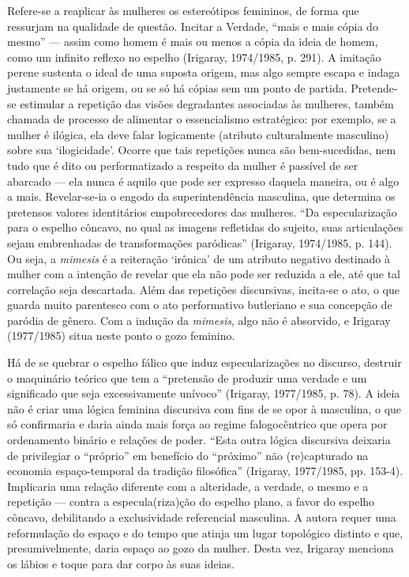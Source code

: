 Refere-se a reaplicar às mulheres os estereótipos femininos, de forma
que ressurjam na qualidade de questão. Incitar a Verdade, ``mais e mais
cópia do mesmo'' --- assim como homem é mais ou menos a cópia da ideia
de homem, como um infinito reflexo no espelho (Irigaray, 1974/1985, p.
291). A imitação perene sustenta o ideal de uma suposta origem, mas algo
sempre escapa e indaga justamente se há origem, ou se só há cópias sem
um ponto de partida. Pretende-se estimular a repetição das visões
degradantes associadas às mulheres, também chamada de processo de
alimentar o essencialismo estratégico: por exemplo, se a mulher é
ilógica, ela deve falar logicamente (atributo culturalmente masculino)
sobre sua `ilogicidade'. Ocorre que tais repetições nunca são
bem-sucedidas, nem tudo que é dito ou performatizado a respeito da
mulher é passível de ser abarcado --- ela nunca é aquilo que pode ser
expresso daquela maneira, ou é algo a mais. Revelar-se-ia o engodo da
superintendência masculina, que determina os pretensos valores
identitários empobrecedores das mulheres. ``Da especularização para o
espelho côncavo, no qual as imagens refletidas do sujeito, suas
articulações sejam embrenhadas de transformações paródicas'' (Irigaray,
1974/1985, p. 144). Ou seja, a \emph{mimesis} é a reiteração `irônica'
de um atributo negativo destinado à mulher com a intenção de revelar que
ela não pode ser reduzida a ele, até que tal correlação seja descartada.
Além das repetições discursivas, incita-se o ato, o que guarda muito
parentesco com o ato performativo butleriano e sua concepção de paródia
de gênero. Com a indução da \emph{mimesis}, algo não é absorvido, e
Irigaray (1977/1985) situa neste ponto o gozo feminino.

Há de se quebrar o espelho fálico que induz especularizações no
discurso, destruir o maquinário teórico que tem a ``pretensão de
produzir uma verdade e um significado que seja excessivamente unívoco''
(Irigaray, 1977/1985, p. 78). A ideia não é criar uma lógica feminina
discursiva com fins de se opor à masculina, o que só confirmaria e daria
ainda mais força ao regime falogocêntrico que opera por ordenamento
binário e relações de poder. ``Esta outra lógica discursiva deixaria de
privilegiar o ``próprio'' em benefício do ``próximo'' não (re)capturado
na economia espaço-temporal da tradição filosófica'' (Irigaray,
1977/1985, pp. 153-4). Implicaria uma relação diferente com a
alteridade, a verdade, o mesmo e a repetição --- contra a
especula(riza)ção do espelho plano, a favor do espelho côncavo,
debilitando a exclusividade referencial masculina. A autora requer uma
reformulação do espaço e do tempo que atinja um lugar topológico
distinto e que, presumivelmente, daria espaço ao gozo da mulher. Desta
vez, Irigaray menciona os lábios e toque para dar corpo às suas ideias.

